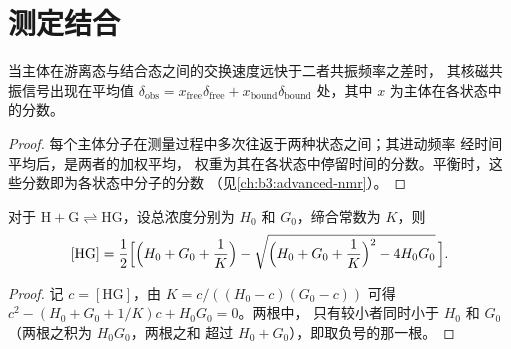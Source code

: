 \section{测定结合}

\begin{proposition}[快速交换]\label{prop:b3:supramolecular:fast-exchange}
当主体在游离态与结合态之间的交换速度远快于二者共振频率之差时，
其核磁共振信号出现在平均值
$\delta_{\mathrm{obs}} = x_{\mathrm{free}}\delta_{\mathrm{free}} + x_{\mathrm{bound}}\delta_{\mathrm{bound}}$ 处，其中 $x$ 为主体在各状态中的分数。
\end{proposition}

\begin{proof}
每个主体分子在测量过程中多次往返于两种状态之间；其进动频率
经时间平均后，是两者的加权平均，
权重为其在各状态中停留时间的分数。平衡时，这些分数即为各状态中分子的分数
（见\cref{ch:b3:advanced-nmr}）。
\end{proof}

\begin{theorem}\label{thm:b3:supramolecular:isotherm}
对于 $\mathrm{H + G \rightleftharpoons HG}$，设总浓度分别为 $H_0$ 和 $G_0$，缔合常数为 $K$，则
\[
  [\mathrm{HG}] = \frac{1}{2}\Bigl[\Bigl(H_0 + G_0 + \frac1K\Bigr) - \sqrt{\Bigl(H_0 + G_0 + \frac1K\Bigr)^2 - 4H_0G_0}\,\Bigr].
\]
\end{theorem}

\begin{proof}
记 $c = [\mathrm{HG}]$，由 $K = c/((H_0 - c)(G_0 - c))$ 可得 $c^2 - (H_0 + G_0 + 1/K)c + H_0G_0 = 0$。两根中，
只有较小者同时小于 $H_0$ 和 $G_0$（两根之积为 $H_0G_0$，两根之和
超过 $H_0 + G_0$），即取负号的那一根。
\end{proof}


